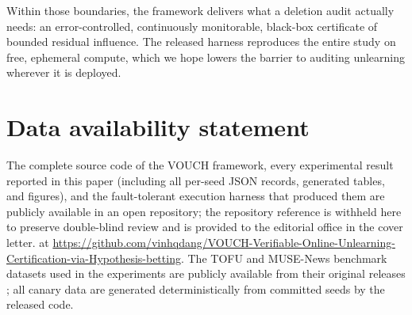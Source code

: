 \documentclass[pdflatex,sn-mathphys-num]{sn-jnl}
\theoremstyle{thmstyleone}
\theoremstyle{thmstyletwo}
\theoremstyle{thmstylethree}
\begin{document}
Within those boundaries, the framework delivers what a deletion audit actually needs:
an error-controlled, continuously monitorable, black-box certificate of bounded
residual influence. The released harness reproduces the entire study on free, ephemeral
compute, which we hope lowers the barrier to auditing unlearning wherever it is
deployed.

\backmatter

\section*{Data availability statement}

The complete source code of the VOUCH framework, every experimental result reported
in this paper (including all per-seed JSON records, generated tables, and figures),
and the fault-tolerant execution harness that produced them are publicly available
\ifanon
in an open repository; the repository reference is withheld here to preserve
double-blind review and is provided to the editorial office in the cover letter.
\else
at \url{https://github.com/vinhqdang/VOUCH-Verifiable-Online-Unlearning-Certification-via-Hypothesis-betting}.
\fi
The TOFU and MUSE-News benchmark datasets used in the experiments are publicly
available from their original releases \citep{maini2024tofu,shi2024muse}; all
canary data are generated deterministically from committed seeds by the released
code.


\end{document}
